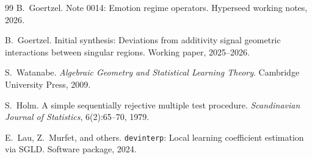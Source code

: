 \documentclass[11pt,a4paper]{article}
\theoremstyle{definition}
\theoremstyle{remark}
\begin{document}
\begin{thebibliography}{99}
B.~Goertzel.
\newblock Note 0014: Emotion regime operators.
\newblock Hyperseed working notes, 2026.

B.~Goertzel.
\newblock Initial synthesis: Deviations from additivity signal geometric
  interactions between singular regions.
\newblock Working paper, 2025--2026.

S.~Watanabe.
\newblock \emph{Algebraic Geometry and Statistical Learning Theory}.
\newblock Cambridge University Press, 2009.

S.~Holm.
\newblock A simple sequentially rejective multiple test procedure.
\newblock \emph{Scandinavian Journal of Statistics}, 6(2):65--70, 1979.

E.~Lau, Z.~Murfet, and others.
\newblock \texttt{devinterp}: Local learning coefficient estimation via {SGLD}.
\newblock Software package, 2024.

\end{thebibliography}
\end{document}
